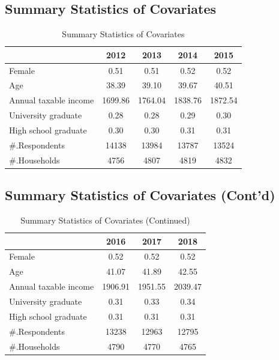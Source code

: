\documentclass[ review  , 3p ]{elsarticle}
\begin{document}
  \hypertarget{summary-statistics-of-covariates}{%
  \subsection{Summary Statistics of Covariates}\label{summary-statistics-of-covariates}}
  
  \begin{table}
  
  \caption{\label{tab:kableSummaryCovariate}Summary Statistics of Covariates}
  \centering
  \begin{tabular}[t]{lcccc}
  \toprule
   & 2012 & 2013 & 2014 & 2015\\
  \midrule
  Female & 0.51 & 0.51 & 0.52 & 0.52\\
  Age & 38.39 & 39.10 & 39.67 & 40.51\\
  Annual taxable income & 1699.86 & 1764.04 & 1838.76 & 1872.54\\
  University graduate & 0.28 & 0.28 & 0.29 & 0.30\\
  High school graduate & 0.30 & 0.30 & 0.31 & 0.31\\
  \#.Respondents & 14138 & 13984 & 13787 & 13524\\
  \#.Households & 4756 & 4807 & 4819 & 4832\\
  \bottomrule
  \end{tabular}
  \end{table}
  
  \hypertarget{summary-statistics-of-covariates-contd}{%
  \subsection{Summary Statistics of Covariates (Cont'd)}\label{summary-statistics-of-covariates-contd}}
  
  \begin{table}
  
  \caption{\label{tab:kableSummaryCovariate2}Summary Statistics of Covariates (Continued)}
  \centering
  \begin{tabular}[t]{lccc}
  \toprule
   & 2016 & 2017 & 2018\\
  \midrule
  Female & 0.52 & 0.52 & 0.52\\
  Age & 41.07 & 41.89 & 42.55\\
  Annual taxable income & 1906.91 & 1951.55 & 2039.47\\
  University graduate & 0.31 & 0.33 & 0.34\\
  High school graduate & 0.31 & 0.31 & 0.31\\
  \#.Respondents & 13238 & 12963 & 12795\\
  \#.Households & 4790 & 4770 & 4765\\
  \bottomrule
  \end{tabular}
  \end{table}
  
\end{document}
